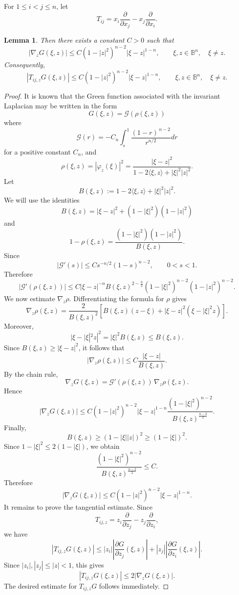 \documentclass[12pt]{amsart}
\numberwithin{equation}{section}
\newtheorem{lemma}[thm]{Lemma}
\newcommand{\Bn}{\mathbb B^n}
\theoremstyle{plain}
\numberwithin{equation}{section}
\numberwithin{theorem}{section}
\numberwithin{proposition}{section}
\begin{document}
For 
 \(1\le i<j\le n\),
let
\[
T_{ij}
=
x_i\frac{\partial}{\partial x_j}
-
x_j\frac{\partial}{\partial x_i}.
\]
\begin{lemma}\label{gradient}
 Then there exists a constant \(C>0\) such that
\[
|\nabla_zG(\xi,z)|
\le
C(1-|z|^2)^{n-2}|\xi-z|^{1-n},
\qquad
\xi,z\in\Bn,\quad \xi\ne z.
\]
Consequently,
\[
|T_{ij,z}G(\xi,z)|
\le
C(1-|z|^2)^{n-2}|\xi-z|^{1-n},
\qquad
\xi,z\in\Bn,\quad \xi\ne z.
\]
\end{lemma}
\begin{proof} It is known \cite{St} that the Green function associated with the invariant Laplacian may be written in
the form
$$G(\xi, z) = \mathcal G(\rho(\xi,z))$$
where 
 \[
\mathcal G(r)
=
-C_n \int_{s}^1\frac{(1-r)^{\,n-2}}{r^{n/2}} dr
\]
for a positive constant $C_n$, and
\[
\rho(\xi,z)
=
|\varphi_z(\xi)|^2
=
\frac{|\xi-z|^2}
     {1-2\langle \xi,z\rangle+|\xi|^2|z|^2}.
\]
Let
\[
B(\xi,z)
:=
1-2\langle \xi,z\rangle+|\xi|^2|z|^2.
\]
We will use the identities
\[
B(\xi,z)=|\xi-z|^2+(1-|\xi|^2)(1-|z|^2)
\]
and
\[
1-\rho(\xi,z)
=
\frac{(1-|\xi|^2)(1-|z|^2)}{B(\xi,z)}.
\]
Since
\[
|\mathcal G'(s)|
\le
C s^{-n/2}(1-s)^{n-2},
\qquad 0<s<1.
\]
Therefore
\[
|\mathcal G'(\rho(\xi,z))|
\le
C
|\xi-z|^{-n}
B(\xi,z)^{2-\frac n2}
(1-|\xi|^2)^{n-2}
(1-|z|^2)^{n-2}.
\]
We now estimate \(\nabla_z\rho\). Differentiating the formula for \(\rho\)
gives
\[
\nabla_z\rho(\xi,z)
=
\frac{2}{B(\xi,z)^2}
\left[
B(\xi,z)(z-\xi)
+
|\xi-z|^2(\xi-|\xi|^2z)
\right].
\]
Moreover,
\[
|\xi-|\xi|^2z|^2
=
|\xi|^2B(\xi,z)
\le
B(\xi,z).
\]
Since \(B(\xi,z)\ge |\xi-z|^2\), it follows that
\[
|\nabla_z\rho(\xi,z)|
\le
C\frac{|\xi-z|}{B(\xi,z)}.
\]
By the chain rule,
\[
\nabla_zG(\xi,z)
=
\mathcal G'(\rho(\xi,z))\,\nabla_z\rho(\xi,z).
\]
Hence
\[
|\nabla_zG(\xi,z)|
\le
C
(1-|z|^2)^{n-2}
|\xi-z|^{1-n}
\frac{(1-|\xi|^2)^{n-2}}{B(\xi,z)^{\frac{n-2}{2}}}.
\]
Finally,
\[
B(\xi,z)\ge (1-|\xi||z|)^2
\ge (1-|\xi|)^2.
\]
Since \(1-|\xi|^2\le 2(1-|\xi|)\), we obtain
\[
\frac{(1-|\xi|^2)^{n-2}}{B(\xi,z)^{\frac{n-2}{2}}}
\le C.
\]
Therefore
\[
|\nabla_zG(\xi,z)|
\le
C(1-|z|^2)^{n-2}|\xi-z|^{1-n}.
\]
It remains to prove the tangential estimate. Since
\[
T_{ij,z}
=
z_i\frac{\partial}{\partial z_j}
-
z_j\frac{\partial}{\partial z_i},
\]
we have
\[
|T_{ij,z}G(\xi,z)|
\le
|z_i|\left|\frac{\partial G}{\partial z_j}(\xi,z)\right|
+
|z_j|\left|\frac{\partial G}{\partial z_i}(\xi,z)\right|.
\]
Since \(|z_i|,|z_j|\le |z|<1\), this gives
\[
|T_{ij,z}G(\xi,z)|
\le
2|\nabla_zG(\xi,z)|.
\]
The desired estimate for \(T_{ij,z}G\) follows immediately.
\end{proof}
\end{document}
